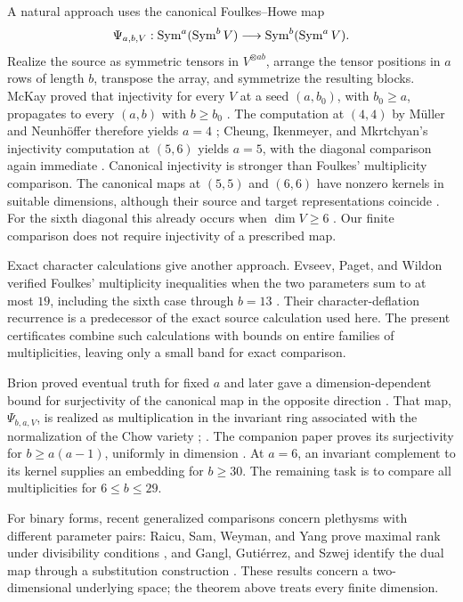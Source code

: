 A natural approach uses the canonical Foulkes--Howe map
\[
 \Psi_{a,b,V}:\operatorname{Sym}^a(\operatorname{Sym}^b V)\longrightarrow\operatorname{Sym}^b(\operatorname{Sym}^a V).
\]
Realize the source as symmetric tensors in \(V^{\otimes ab}\), arrange
the tensor positions in \(a\) rows of length \(b\), transpose the array,
and symmetrize the resulting blocks. McKay proved that injectivity
for every \(V\) at a seed \((a,b_0)\), with \(b_0\ge a\), propagates to every
\((a,b)\) with \(b\ge b_0\)
\cite{McKay2008,Ikenmeyer2015}.
The computation at \((4,4)\) by M\"uller and Neunh\"offer therefore
yields \(a=4\) \cite{MuellerNeunhoeffer2005};
Cheung, Ikenmeyer, and Mkrtchyan's injectivity computation at \((5,6)\)
yields \(a=5\), with the diagonal comparison again immediate
\cite[preprint, Theorem~6(a)]{CheungIkenmeyerMkrtchyan2017}.
Canonical injectivity is stronger than Foulkes' multiplicity comparison.
The canonical maps at \((5,5)\) and \((6,6)\) have nonzero kernels in
suitable dimensions, although their source and target representations
coincide \cite{MuellerNeunhoeffer2005,CheungIkenmeyerMkrtchyan2017}.
For the sixth diagonal this already occurs when \(\dim V\ge6\)
\cite[preprint, Theorem~6(c)]{CheungIkenmeyerMkrtchyan2017}.
Our finite comparison does not require injectivity of a prescribed map.

Exact character calculations give another approach.
Evseev, Paget, and Wildon verified Foulkes' multiplicity inequalities
when the two parameters sum to at most \(19\), including the sixth
case through \(b=13\)
\cite[Corollary~5.2]{EvseevPagetWildon2014}.
Their character-deflation recurrence is a predecessor of the exact
source calculation used here. The present certificates combine such
calculations with bounds on entire families of multiplicities, leaving
only a small band for exact comparison.

Brion proved eventual truth for fixed \(a\)
\cite[Corollary~1.3]{Brion1993} and later gave a dimension-dependent
bound for surjectivity of the canonical map in the opposite direction
\cite[Theorem~3.3]{Brion1997}.
That map, \(\Psi_{b,a,V}\), is realized as multiplication in the invariant
ring associated with the normalization of the Chow variety
\cite[Section~7]{Landsberg2015}; \cite[Section~2]{RaicuSamWeyman2022}.
The companion paper proves its surjectivity for \(b\ge a(a-1)\),
uniformly in dimension \cite[Theorem~1]{OpenAIQuadratic2026}.
At \(a=6\), an invariant complement to its kernel supplies an
embedding for \(b\ge30\). The remaining task is to compare all
multiplicities for \(6\le b\le29\).

For binary forms, recent generalized comparisons concern plethysms
with different parameter pairs: Raicu, Sam, Weyman, and Yang prove
maximal rank under divisibility conditions
\cite[Theorem~1.4]{RaicuSamWeymanYang2026}, and Gangl, Guti\'errez,
and Szwej identify the dual map through a substitution construction
\cite[Theorem~1.2]{GanglGutierrezSzwej2026}.
These results concern a two-dimensional underlying space; the theorem
above treats every finite dimension.

